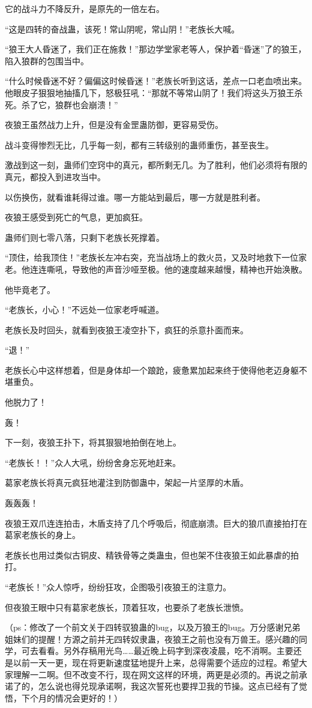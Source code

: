 \begin{this_body}
它的战斗力不降反升，是原先的一倍左右。

“这是四转的奋战蛊，该死！常山阴呢，常山阴！”老族长大喊。

“狼王大人昏迷了，我们正在施救！”那边学堂家老等人，保护着“昏迷”了的狼王，陷入狼群的包围当中。

“什么时候昏迷不好？偏偏这时候昏迷！”老族长听到这话，差点一口老血喷出来。他眼皮子狠狠地抽搐几下，怒极狂吼：“那就不等常山阴了！我们将这头万狼王杀死。杀了它，狼群也会崩溃！”

夜狼王虽然战力上升，但是没有金罡蛊防御，更容易受伤。

战斗变得惨烈无比，几乎每一刻，都有三转级别的蛊师重伤，甚至丧生。

激战到这一刻，蛊师们空窍中的真元，都所剩无几。为了胜利，他们必须将有限的真元，都投入到进攻当中。

以伤换伤，就看谁耗得过谁。哪一方能站到最后，哪一方就是胜利者。

夜狼王感受到死亡的气息，更加疯狂。

蛊师们则七零八落，只剩下老族长死撑着。

“顶住，给我顶住！”老族长左冲右突，充当战场上的救火员，又及时地救下一位家老。他连连嘶吼，导致他的声音沙哑至极。他的速度越来越慢，精神也开始涣散。

他毕竟老了。

“老族长，小心！”不远处一位家老呼喊道。

老族长及时回头，就看到夜狼王凌空扑下，疯狂的杀意扑面而来。

“退！”

老族长心中这样想着，但是身体却一个踉跄，疲惫累加起来终于使得他老迈身躯不堪重负。

他脱力了！

轰！

下一刻，夜狼王扑下，将其狠狠地拍倒在地上。

“老族长！！”众人大吼，纷纷舍身忘死地赶来。

葛家老族长将真元疯狂地灌注到防御蛊中，架起一片坚厚的木盾。

轰轰轰！

夜狼王双爪连连拍击，木盾支持了几个呼吸后，彻底崩溃。巨大的狼爪直接拍打在葛家老族长的身上。

老族长也用过类似古铜皮、精铁骨等之类蛊虫，但也架不住夜狼王如此暴虐的拍打。

“老族长！”众人惊呼，纷纷狂攻，企图吸引夜狼王的注意力。

但夜狼王眼中只有葛家老族长，顶着狂攻，也要杀了老族长泄愤。

（ps：修改了一个前文关于四转驭狼蛊的bug，以及万狼王的bug。万分感谢兄弟姐妹们的提醒！方源之前并无四转奴隶蛊，夜狼王之前也没有万兽王。感兴趣的同学，可去看看。另外存稿用光鸟……最近晚上码字到深夜凌晨，吃不消啊。主要还是以前一天一更，现在将更新速度猛地提升上来，总得需要个适应的过程。希望大家理解一二啊。但不改变不行，现在网文这样的环境，两更是必须的。再说之前承诺了的，怎么说也得兑现承诺啊，我这次誓死也要捍卫我的节操。这点已经有了觉悟，下个月的情况会更好的！）

\end{this_body}

